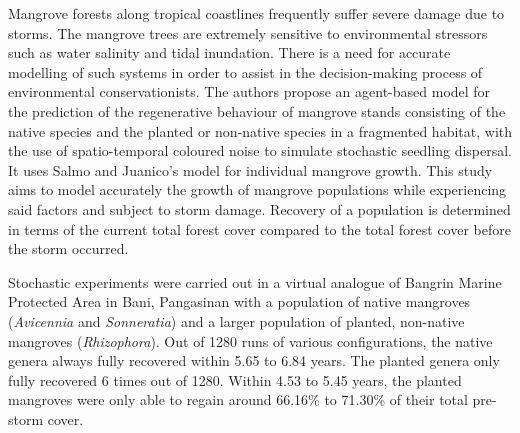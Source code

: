 Mangrove forests along tropical coastlines frequently suffer severe damage due to storms. The mangrove trees are extremely sensitive to environmental stressors such as water salinity and tidal inundation. There is a need for accurate modelling of such systems in order to assist in the decision-making process of environmental conservationists. The authors propose an agent-based model for the prediction of the regenerative behaviour of mangrove stands consisting of the native species and the planted or non-native species in a fragmented habitat, with the use of spatio-temporal coloured noise to simulate stochastic seedling dispersal. It uses Salmo and Juanico's model for individual mangrove growth. This study aims to model accurately the growth of mangrove populations while experiencing said factors and subject to storm damage. Recovery of a population is determined in terms of the current total forest cover compared to the total forest cover before the storm occurred.

Stochastic experiments were carried out in a virtual analogue of Bangrin Marine Protected Area in Bani, Pangasinan with a population of native mangroves (\textit{Avicennia} and \textit{Sonneratia}) and a larger population of planted, non-native mangroves (\textit{Rhizophora}). Out of 1280 runs of various configurations, the native genera always fully recovered within 5.65 to  6.84 years. The planted genera only fully recovered 6 times out of 1280. Within 4.53 to 5.45 years, the planted mangroves were only able to regain around 66.16\% to 71.30\% of their total pre-storm cover.